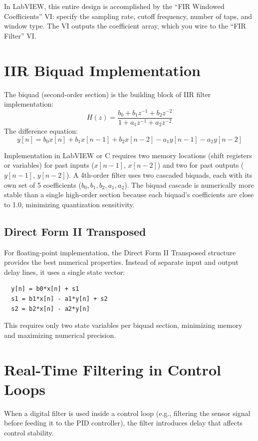 \documentclass[11pt,letterpaper,twoside,openany]{book}
\begin{document}
In LabVIEW, this entire design is accomplished by the ``FIR Windowed Coefficients'' VI: specify the sampling rate, cutoff frequency, number of taps, and window type. The VI outputs the coefficient array, which you wire to the ``FIR Filter'' VI.

\section{IIR Biquad Implementation}
The biquad (second-order section) is the building block of IIR filter implementation:
\begin{equation}
H(z) = \frac{b_0 + b_1 z^{-1} + b_2 z^{-2}}{1 + a_1 z^{-1} + a_2 z^{-2}}
\end{equation}
The difference equation:
\begin{equation}
y[n] = b_0 x[n] + b_1 x[n-1] + b_2 x[n-2] - a_1 y[n-1] - a_2 y[n-2]
\end{equation}

Implementation in LabVIEW or C requires two memory locations (shift registers or variables) for past inputs ($x[n-1]$, $x[n-2]$) and two for past outputs ($y[n-1]$, $y[n-2]$). A 4th-order filter uses two cascaded biquads, each with its own set of 5 coefficients ($b_0, b_1, b_2, a_1, a_2$). The biquad cascade is numerically more stable than a single high-order section because each biquad's coefficients are close to 1.0, minimizing quantization sensitivity.

\subsection{Direct Form II Transposed}
For floating-point implementation, the Direct Form II Transposed structure provides the best numerical properties. Instead of separate input and output delay lines, it uses a single state vector:
\begin{verbatim}
  y[n] = b0*x[n] + s1
  s1 = b1*x[n] - a1*y[n] + s2
  s2 = b2*x[n] - a2*y[n]
\end{verbatim}
This requires only two state variables per biquad section, minimizing memory and maximizing numerical precision.

\section{Real-Time Filtering in Control Loops}
When a digital filter is used inside a control loop (e.g., filtering the sensor signal before feeding it to the PID controller), the filter introduces delay that affects control stability.
\end{document}
